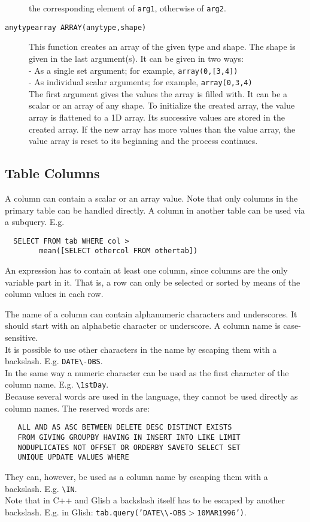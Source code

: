\begin{description}
       the corresponding element of \texttt{arg1}, otherwise of \texttt{arg2}.
  \item[ \texttt{anytypearray ARRAY(anytype,shape)}]
       This function creates an array of the given type and shape.
       The shape is given in the last argument(s).
       It can be given in two ways:
       \\- As a single set argument; for example, \texttt{array(0,[3,4])}
       \\- As individual scalar arguments; for example, \texttt{array(0,3,4)}
       \\The first argument gives the values the array is filled with.
       It can be a scalar or an array of any shape. To initialize the
       created array, the value array is flattened to a 1D array.
       Its successive values are stored in the created array. If the
       new array has more values than the value array, the value array is
       reset to its beginning and the process continues.
\end{description}

\subsection{\label{TAQL:COLUMNS}Table Columns}
A column can contain a scalar or an array value.
Note that only columns in the primary table can be handled directly.
A column in another table can be used via a subquery. E.g.
\begin{verbatim}
  SELECT FROM tab WHERE col >
        mean([SELECT othercol FROM othertab])
\end{verbatim}
An expression has to contain at least one column, since columns
are the only variable part in it. That is, a row can only be selected
or sorted by means of the column values in each row.

The name of a column can contain alphanumeric characters and underscores.
It should start with an alphabetic character or underscore.
A column name is case-sensitive.
\\It is possible to use other characters in the name by
escaping them with a backslash. E.g. \texttt{DATE}\verb+\+\texttt{-OBS}.
\\In the same way a numeric character can be used as the first
character of the column name. E.g. \verb+\+\texttt{1stDay}.
\\
Because several words are used in the language, they cannot
be used directly as column names. The reserved words are:
\begin{verbatim}
   ALL AND AS ASC BETWEEN DELETE DESC DISTINCT EXISTS
   FROM GIVING GROUPBY HAVING IN INSERT INTO LIKE LIMIT
   NODUPLICATES NOT OFFSET OR ORDERBY SAVETO SELECT SET
   UNIQUE UPDATE VALUES WHERE
\end{verbatim}
They can, however, be used as a column name by escaping
them with a backslash. E.g. \verb+\+\texttt{IN}.
\\Note that in C++ and Glish a backslash itself has to be escaped
by another backslash. E.g. in Glish:
\texttt{tab.query('DATE}\verb+\\+\texttt{-OBS$>$10MAR1996')}.

